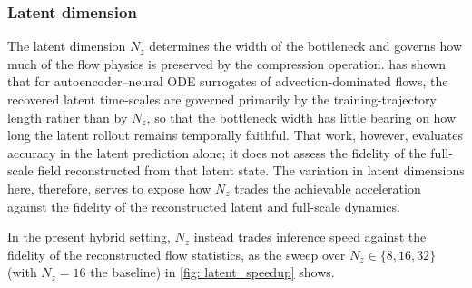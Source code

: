\subsubsection{Latent dimension}
The latent dimension $N_z$ determines the width of the bottleneck and governs how much of the flow physics is preserved by the compression operation. \textcite{Nair2024} has shown that for autoencoder--neural ODE surrogates of advection-dominated flows, the recovered latent time-scales are governed primarily by the training-trajectory length rather than by $N_z$, so that the bottleneck width has little bearing on how long the latent rollout remains temporally faithful. That work, however, evaluates accuracy in the latent prediction alone; it does not assess the fidelity of the full-scale field reconstructed from that latent state. The variation in latent dimensions here, therefore, serves to expose how $N_z$ trades the achievable acceleration against the fidelity of the reconstructed latent and full-scale dynamics.



In the present hybrid setting, $N_z$ instead trades inference speed against the fidelity of the reconstructed flow statistics, as the sweep over $N_z \in \{8, 16, 32\}$ (with $N_z = 16$ the baseline) in \autoref{fig: latent_speedup} shows. 

